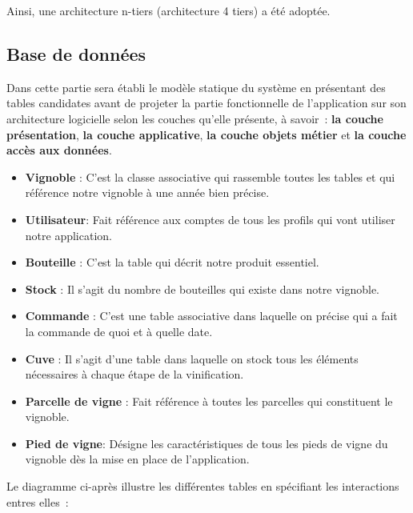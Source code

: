 \documentclass[a4paper, titlepage]{report}
\providecommand{\tightlist}{%
  \setlength{\itemsep}{0pt}\setlength{\parskip}{0pt}}
\begin{document}
Ainsi, une architecture n-tiers (architecture 4 tiers) a été adoptée.

\subsection{Base de données}

Dans cette partie sera établi le modèle statique du système en
présentant des tables candidates avant de projeter la partie
fonctionnelle de l'application sur son architecture logicielle selon les
couches qu'elle présente, à savoir~: \textbf{la couche présentation}, \textbf{la couche
applicative}, \textbf{la couche objets métier} et \textbf{la couche accès aux données}.

\begin{itemize}
\tightlist
\item \textbf{Vignoble} : C'est la classe associative qui rassemble toutes les tables et qui référence notre vignoble à une année bien précise.
\item \textbf{Utilisateur}: Fait référence aux comptes de tous les profils qui vont utiliser notre application.
\item \textbf{Bouteille} : C'est la table qui décrit notre produit essentiel. 
\item \textbf{Stock} : Il s'agit du nombre de bouteilles qui existe dans notre vignoble.
\item \textbf{Commande} : C'est une table associative dans laquelle on précise qui a fait la commande de quoi et à quelle date.
\item \textbf{Cuve} : Il s'agit d'une table dans laquelle on stock tous les éléments nécessaires à chaque étape de la vinification.
\item \textbf{Parcelle de vigne} : Fait référence à toutes les parcelles qui constituent le vignoble.
\item \textbf{Pied de vigne}: Désigne les caractéristiques de tous les pieds de vigne du vignoble dès la mise en place de l'application.
\end{itemize}

Le diagramme ci-après illustre les différentes tables en spécifiant les
interactions entres elles~:
\end{document}
